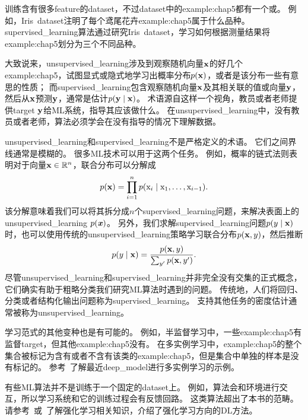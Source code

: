 训练含有很多\gls{feature}的\gls{dataset}，不过\gls{dataset}中的\gls{example:chap5}都有一个或。
例如，Iris~\gls{dataset}注明了每个鸢尾花卉\gls{example:chap5}属于什么品种。
\gls{supervised_learning}算法通过研究Iris~\gls{dataset}，学习如何根据测量结果将\gls{example:chap5}划分为三个不同品种。

大致说来，\gls{unsupervised_learning}涉及到观察随机向量$\mathbf{x}$的好几个\gls{example:chap5}，试图显式或隐式地学习出概率分布$p(\mathbf{x})$，或者是该分布一些有意思的性质；
而\gls{supervised_learning}包含观察随机向量$\mathbf{x}$及其相关联的值或向量$\mathbf{y}$，然后从$\mathbf{x}$预测$\mathbf{y}$，通常是估计$p(\mathbf{y}\mid\mathbf{x})$。
术语源自这样一个视角，教员或者老师提供\gls{target} $\mathbf{y}$给\gls{ML}系统，指导其应该做什么。
在\gls{unsupervised_learning}中，没有教员或者老师，算法必须学会在没有指导的情况下理解数据。

\gls{unsupervised_learning}和\gls{supervised_learning}不是严格定义的术语。
它们之间界线通常是模糊的。
很多\gls{ML}技术可以用于这两个任务。
例如，概率的链式法则表明对于向量$\mathbf{x}\in\mathbb{R}^n$，联合分布可以分解成
\begin{equation}
    p(\mathbf{x}) = \prod_{i=1}^n p(\mathrm{x}_i \mid \mathrm{x}_1,\dots,\mathrm{x}_{i-1}) .
\end{equation}
该分解意味着我们可以将其拆分成$n$个\gls{supervised_learning}问题，来解决表面上的\gls{unsupervised_learning} $p(\boldsymbol{\mathit{x}})$。
另外，我们求解\gls{supervised_learning}问题$p(y\mid\mathbf{x})$时，也可以使用传统的\gls{unsupervised_learning}策略学习联合分布$p(\mathbf{x},y)$，然后推断
\begin{equation}
    p(y\mid\mathbf{x}) = \frac{p(\mathbf{x},y)}{\sum_{y'}p(\mathbf{x},y')}.
\end{equation}
尽管\gls{unsupervised_learning}和\gls{supervised_learning}并非完全没有交集的正式概念，它们确实有助于粗略分类我们研究\gls{ML}算法时遇到的问题。
传统地，人们将回归、分类或者结构化输出问题称为\gls{supervised_learning}。
支持其他任务的密度估计通常被称为\gls{unsupervised_learning}。


学习范式的其他变种也是有可能的。
例如，半监督学习中，一些\gls{example:chap5}有监督\gls{target}，但其他\gls{example:chap5}没有。
在多实例学习中，\gls{example:chap5}的整个集合被标记为含有或者不含有该类的\gls{example:chap5}，但是集合中单独的样本是没有标记的。
参考~\cite{Kotzias2015}了解最近\gls{deep_model}进行多实例学习的示例。

有些\gls{ML}算法并不是训练于一个固定的\gls{dataset}上。
例如，算法会和环境进行交互，所以学习系统和它的训练过程会有反馈回路。
这类算法超出了本书的范畴。
请参考~\cite{Sutton+Barto-98}或~\cite{Bertsekas+Tsitsiklis-book1996}了解强化学习相关知识，\citet{Deepmind-atari-arxiv2013}介绍了强化学习方向的\gls{DL}方法。

